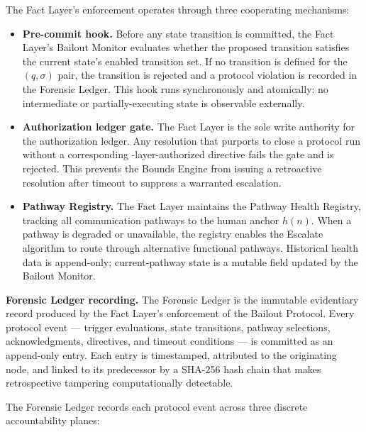The Fact Layer's enforcement operates through three cooperating mechanisms:

\begin{itemize}\itemsep=0pt
\item[(\textit{i})] \textbf{Pre-commit hook.} Before any state transition is committed, the Fact Layer's Bailout Monitor evaluates whether the proposed transition satisfies the current state's enabled transition set. If no transition is defined for the $(q, \sigma)$ pair, the transition is rejected and a protocol violation is recorded in the Forensic Ledger. This hook runs synchronously and atomically: no intermediate or partially-executing state is observable externally.

\item[(\textit{ii})] \textbf{Authorization ledger gate.} The Fact Layer is the sole write authority for the authorization ledger. Any resolution that purports to close a protocol run without a corresponding \purpose-layer-authorized directive fails the gate and is rejected. This prevents the Bounds Engine from issuing a retroactive resolution after timeout to suppress a warranted escalation.

\item[(\textit{iii})] \textbf{Pathway Registry.} The Fact Layer maintains the Pathway Health Registry, tracking all communication pathways to the human anchor $h(n)$. When a pathway is degraded or unavailable, the registry enables the Escalate algorithm to route through alternative functional pathways. Historical health data is append-only; current-pathway state is a mutable field updated by the Bailout Monitor.
\end{itemize}

\bigskip
\noindent\textbf{Forensic Ledger recording.} The Forensic Ledger is the immutable evidentiary record produced by the Fact Layer's enforcement of the Bailout Protocol. Every protocol event — trigger evaluations, state transitions, pathway selections, acknowledgments, directives, and timeout conditions — is committed as an append-only entry. Each entry is timestamped, attributed to the originating node, and linked to its predecessor by a SHA-256 hash chain that makes retrospective tampering computationally detectable.

The Forensic Ledger records each protocol event across three discrete accountability planes:

